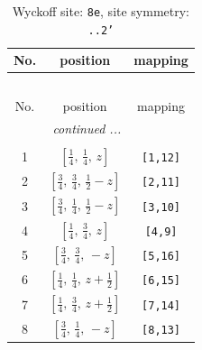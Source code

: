 \documentclass[fleqn,8pt]{jsarticle}
\begin{document}
\begin{longtable}{ccc}
\caption{Wyckoff site: {\tt 8e}, site symmetry: {\tt ..2'}}
 \\
 \hline \hline
No. & position & mapping \\ \hline \endfirsthead

\multicolumn{2}{l}{\tablename\ \thetable{}} \\
 \hline \hline
No. & position & mapping \\ \hline \endhead

 \hline \hline
\multicolumn{2}{r}{\footnotesize\it continued ...} \\ \endfoot

 \hline \hline
\multicolumn{2}{r}{} \\ \endlastfoot

1 & $\left[ \frac{1}{4},\, \frac{1}{4},\, z \right]$ & {\tt [1,12]} \\ \hline
2 & $\left[ \frac{3}{4},\, \frac{3}{4},\, \frac{1}{2} - z \right]$ & {\tt [2,11]} \\ \hline
3 & $\left[ \frac{3}{4},\, \frac{1}{4},\, \frac{1}{2} - z \right]$ & {\tt [3,10]} \\ \hline
4 & $\left[ \frac{1}{4},\, \frac{3}{4},\, z \right]$ & {\tt [4,9]} \\ \hline
5 & $\left[ \frac{3}{4},\, \frac{3}{4},\, - z \right]$ & {\tt [5,16]} \\ \hline
6 & $\left[ \frac{1}{4},\, \frac{1}{4},\, z + \frac{1}{2} \right]$ & {\tt [6,15]} \\ \hline
7 & $\left[ \frac{1}{4},\, \frac{3}{4},\, z + \frac{1}{2} \right]$ & {\tt [7,14]} \\ \hline
8 & $\left[ \frac{3}{4},\, \frac{1}{4},\, - z \right]$ & {\tt [8,13]} \\
\end{longtable}
\renewcommand{\arraystretch}{1.2}
\end{document}
